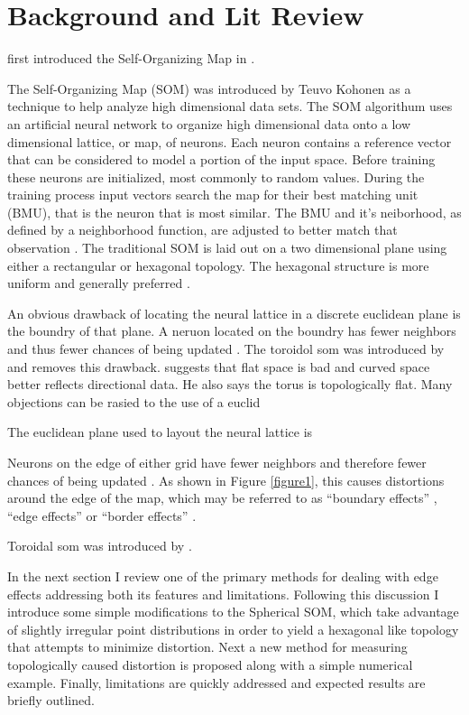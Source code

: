 \documentclass[12pt]{article}
\begin{document}
\section{Background and Lit Review}
\citeauthor{Kohonen:1982uq} first introduced the Self-Organizing Map in
\citeyear{Kohonen:1982uq}.

The Self-Organizing Map (SOM) was introduced by Teuvo Kohonen as a technique to
help analyze high dimensional data sets. The SOM algorithum uses an artificial
neural network to organize high dimensional data onto a low dimensional lattice,
or map, of neurons.  Each neuron contains a reference vector that can be
considered to model a portion of the input space. Before training these neurons
are initialized, most commonly to random values.  During the training process
input vectors search the map for their best matching unit (BMU), that is the
neuron that is most similar. The BMU and it's neiborhood, as defined by a
neighborhood function, are adjusted to better match that observation
\citep{Kohonen2000}.  The traditional SOM is laid out on a two dimensional plane
using either a rectangular or hexagonal topology.  The hexagonal structure is
more uniform and generally preferred \citep{Wu:2006lr}.

An obvious drawback of locating the neural lattice in a discrete euclidean plane
is the boundry of that plane.  A neruon located on the boundry has fewer
neighbors and thus fewer chances of being updated \citep{Wu:2006lr}.  The
toroidol som was introduced by \cite{li1993} and removes this drawback.
\cite{ritter99} suggests that flat space is bad and curved space better reflects
directional data.  He also says the torus is topologically flat.
Many objections can be rasied to the use of a euclid

The euclidean plane used to layout the neural lattice is 



Neurons on the edge of either grid have fewer neighbors and therefore fewer
chances of being updated \citep{Wu:2006lr}.  As shown in Figure \ref{figure1},
this causes distortions around the edge of the map, which may be referred to as
``boundary effects'' \citep{ritter99}, ``edge effects'' \citep{boudjemai2003} or
``border effects'' \citep{Wu:2006lr}.

Toroidal som was introduced by \citep{li1993}.


In the next section I review one of the primary methods for dealing with edge
effects addressing both its features and limitations.  Following this
discussion I introduce some simple modifications to the Spherical SOM, which
take advantage of slightly irregular point distributions in order to yield a
hexagonal like topology that attempts to minimize distortion.  Next a new
method for measuring topologically caused distortion is proposed along with a
simple numerical example.  Finally, limitations are quickly addressed and
expected results are briefly outlined.
\end{document}
